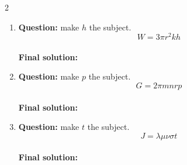 \documentclass[11pt]{article}
\begin{document}
\begin{multicols}{2}
\begin{enumerate}[leftmargin=*, itemsep=10pt]
\item \textbf{Question:} make \( h \) the subject.
\[
W=3\pi r^{2}kh
\] \\[4cm]
\textbf{Final solution:}\\[1.5cm]

\item \textbf{Question:} make \( p \) the subject.
\[
G=2\pi mnrp
\] \\[4cm]
\textbf{Final solution:}\\[1.5cm]

\item \textbf{Question:} make \( t \) the subject.
\[
J=\lambda\mu\nu\sigma t
\] \\[4cm]
\textbf{Final solution:}\\[1.5cm]



\newpage
\end{enumerate}

\end{multicols}
\end{document}
